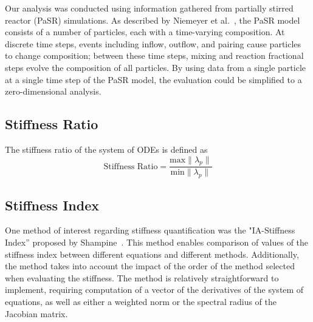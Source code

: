 \documentclass[12pt]{ussci}
\begin{document}

Our analysis was conducted using information gathered from partially stirred reactor (PaSR) simulations.
As described by Niemeyer et al.~\cite{Niemeyer:2017}, the PaSR model consists of a number of particles, each with a time-varying composition.
At discrete time steps, events including inflow, outflow, and pairing cause particles to change composition; between these time steps, mixing and reaction fractional steps evolve the composition of all particles.
By using data from a single particle at a single time step of the PaSR model, the evaluation could be simplified to a zero-dimensional analysis.

\subsection{Stiffness Ratio}

The stiffness ratio of the system of ODEs is defined as
\begin{equation}
	\textrm{Stiffness Ratio} = \frac{\textrm{max}\|\lambda_p\|}{\textrm{min}\|\lambda_p\|}
\end{equation}	

\subsection{Stiffness Index}

One method of interest regarding stiffness quantification was the "IA-Stiffness Index'' proposed by Shampine~\cite{Shampine1982}.
This method enables comparison of values of the stiffness index between different equations and different methods.
Additionally, the method takes into account the impact of the order of the method selected when evaluating the stiffness.
The method is relatively straightforward to implement, requiring computation of a vector of the derivatives of the system of equations, as well as either a weighted norm or the spectral radius of the Jacobian matrix.
\end{document}

